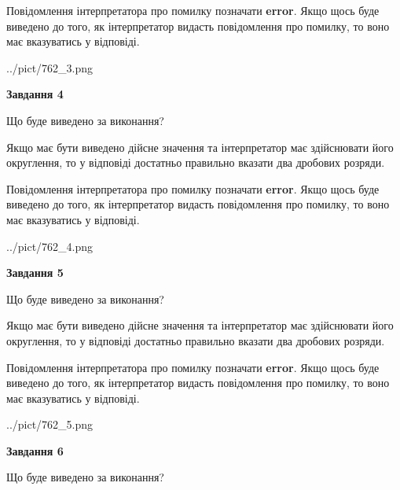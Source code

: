 \documentclass[12pt, ukrainian]{article}
\begin{document}
{\begin {Large}
Повідомлення інтерпретатора про помилку позначати \textbf{error}.
Якщо щось буде виведено до того, як інтерпретатор видасть повідомлення про помилку, 
то воно має вказуватись у відповіді. \par

\begin{center}
	{../pict/762_3.png}
\end{center}
\newpage

{\begin {center}\textbf{Завдання 4}\end {center}}\par
Що буде виведено за виконання? \par

Якщо має бути виведено дійсне значення та інтерпретатор має здійснювати його округлення, 
то у відповіді достатньо правильно вказати два дробових розряди.

Повідомлення інтерпретатора про помилку позначати \textbf{error}.
Якщо щось буде виведено до того, як інтерпретатор видасть повідомлення про помилку, 
то воно має вказуватись у відповіді. \par

\begin{center}
	{../pict/762_4.png}
\end{center}
\newpage

{\begin {center}\textbf{Завдання 5}\end {center}}\par
Що буде виведено за виконання? \par

Якщо має бути виведено дійсне значення та інтерпретатор має здійснювати його округлення, 
то у відповіді достатньо правильно вказати два дробових розряди.

Повідомлення інтерпретатора про помилку позначати \textbf{error}.
Якщо щось буде виведено до того, як інтерпретатор видасть повідомлення про помилку, 
то воно має вказуватись у відповіді. \par

\begin{center}
	{../pict/762_5.png}
\end{center}
\newpage

{\begin {center}\textbf{Завдання 6}\end {center}}\par
Що буде виведено за виконання? \par


\end{Large}}
\end{document}
